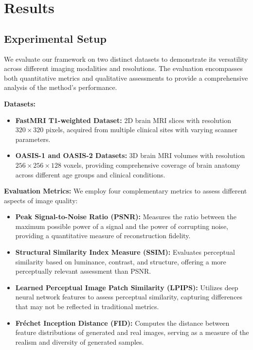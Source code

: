 \documentclass{midl} %
\begin{document}
\section{Results}

\subsection{Experimental Setup}

We evaluate our framework on two distinct datasets to demonstrate its versatility across different imaging modalities and resolutions. The evaluation encompasses both quantitative metrics and qualitative assessments to provide a comprehensive analysis of the method's performance.

\textbf{Datasets:}
\begin{itemize}
\item \textbf{FastMRI T1-weighted Dataset:} 2D brain MRI slices with resolution $320 \times 320$ pixels, acquired from multiple clinical sites with varying scanner parameters.
\item \textbf{OASIS-1 and OASIS-2 Datasets:} 3D brain MRI volumes with resolution $256 \times 256 \times 128$ voxels, providing comprehensive coverage of brain anatomy across different age groups and clinical conditions.
\end{itemize}

\textbf{Evaluation Metrics:} We employ four complementary metrics to assess different aspects of image quality:

\begin{itemize}
\item \textbf{Peak Signal-to-Noise Ratio (PSNR):} Measures the ratio between the maximum possible power of a signal and the power of corrupting noise, providing a quantitative measure of reconstruction fidelity.
\item \textbf{Structural Similarity Index Measure (SSIM):} Evaluates perceptual similarity based on luminance, contrast, and structure, offering a more perceptually relevant assessment than PSNR.
\item \textbf{Learned Perceptual Image Patch Similarity (LPIPS):} Utilizes deep neural network features to assess perceptual similarity, capturing differences that may not be reflected in traditional metrics.
\item \textbf{Fréchet Inception Distance (FID):} Computes the distance between feature distributions of generated and real images, serving as a measure of the realism and diversity of generated samples.
\end{itemize}
\end{document}
